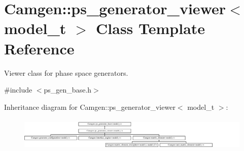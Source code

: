 \hypertarget{a00454}{}\section{Camgen\+:\+:ps\+\_\+generator\+\_\+viewer$<$ model\+\_\+t $>$ Class Template Reference}
\label{a00454}


Viewer class for phase space generators.  




{\ttfamily \#include $<$ps\+\_\+gen\+\_\+base.\+h$>$}

Inheritance diagram for Camgen\+:\+:ps\+\_\+generator\+\_\+viewer$<$ model\+\_\+t $>$\+:\begin{figure}[H]
\begin{center}
\leavevmode
\includegraphics[height=1.609195cm]{a00454}
\end{center}
\end{figure}
